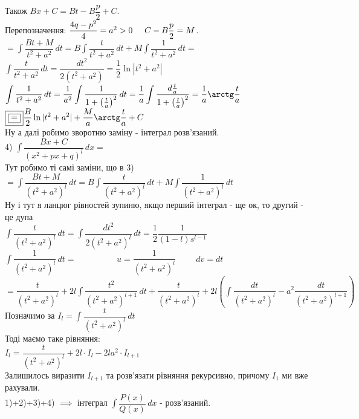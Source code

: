 \documentclass[a4paper, 10pt]{article}
\def\huge{\displaystyle}
\theoremstyle{theoremdd}
\theoremstyle{theoremdd}
\theoremstyle{theoremdd}
\theoremstyle{theoremdd}
\theoremstyle{theoremdd}
\theoremstyle{theoremdd}
\theoremstyle{theoremdd}
\theoremstyle{theoremdd}
\theoremstyle{theoremdd}
\begin{document}
Також $Bx+C = Bt - B\dfrac{p}{2} + C$.\\
Перепозначення: $\dfrac{4q-p^2}{4} = a^2 > 0 \hspace{0.5cm} C - B \dfrac{p}{2} = M$.\\
$\boxed{=} \huge \int \dfrac{Bt + M}{t^2 + a^2}\,dt = B \int \dfrac{t}{t^2+a^2}\,dt + M \int \dfrac{1}{t^2+a^2}\,dt \boxed{\boxed{=}}$\\
$\huge \int \dfrac{t}{t^2+a^2}\,dt = \dfrac{dt^2}{2(t^2+a^2)} = \dfrac{1}{2} \ln|t^2+a^2|$\\
$\huge \int \dfrac{1}{t^2+a^2}\,dt = \dfrac{1}{a^2} \int \dfrac{1}{1 + \left(\frac{t}{a}\right)^2}\,dt = \dfrac{1}{a} \int \dfrac{d \frac{t}{a}}{1 + \left(\frac{t}{a}\right)^2} = \dfrac{1}{a} \arctg \dfrac{t}{a}$\\
$\boxed{\boxed{=}} \huge \frac{B}{2} \ln|t^2+a^2| + \frac{M}{a} \arctg \frac{t}{a} + C$\\
Ну а далі робимо зворотню заміну - інтеграл розв'язаний.
\bigskip \\
4) $\huge \int \dfrac{Bx+C}{(x^2+px+q)^l}\,dx \boxed{=}$\\
Тут робимо ті самі заміни, що в 3)\\
$\boxed{=} \huge \int \dfrac{Bt+M}{(t^2+a^2)^l}\,dt = B \int \dfrac{t}{(t^2+a^2)^l} \,dt + M \int \dfrac{1}{(t^2+a^2)^l}\,dt$\\
Ну і тут я ланцюг рівностей зупиню, якщо перший інтеграл - ще ок, то другий - це дупа\\
$\huge \int \dfrac{t}{(t^2+a^2)^l}\,dt = \int \dfrac{dt^2}{2(t^2+a^2)^l}\,dt = \dfrac{1}{2} \dfrac{1}{(1-l)s^{l-1}}$ \bigskip \\
$\huge \int \dfrac{1}{(t^2+a^2)^l}\,dt \boxed{=} \hspace{2cm} u = \dfrac{1}{(t^2+a^2)^l} \hspace{1cm} dv = dt$\\
$\boxed{=} \huge \dfrac{t}{(t^2+a^2)^l} + 2l \int \dfrac{t^2}{(t^2+a^2)^{l+1}}\,dt + \dfrac{t}{(t^2+a^2)^l} + 2l \left(\int \dfrac{dt}{(t^2+a^2)^l} - a^2 \dfrac{dt}{(t^2+a^2)^{l+1}} \right)$\\
Позначимо за $I_l = \huge \int \dfrac{t}{(t^2+a^2)^l}\,dt$\\
Тоді маємо таке рівняння:\\
$I_l = \dfrac{t}{(t^2+a^2)^l} + 2l \cdot I_l - 2la^2 \cdot I_{l+1}$\\
Залишилось виразити $I_{l+1}$ та розв'язати рівняння рекурсивно, причому $I_1$ ми вже рахували.
\bigskip \\
1)+2)+3)+4) $\implies$ інтеграл $\huge\int \dfrac{P(x)}{Q(x)}\,dx$ - розв'язаний.
\end{document}
